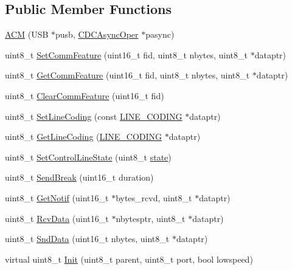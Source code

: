 \subsection*{\-Public \-Member \-Functions}
\begin{DoxyCompactItemize}
\item 
\hyperlink{class_a_c_m_aa5d83ef9d48dab404090e9136522707a}{\-A\-C\-M} (\-U\-S\-B $\ast$pusb, \hyperlink{class_c_d_c_async_oper}{\-C\-D\-C\-Async\-Oper} $\ast$pasync)
\item 
uint8\-\_\-t \hyperlink{class_a_c_m_a62c91ac62e8e3bf66bc3940d5b934c10}{\-Set\-Comm\-Feature} (uint16\-\_\-t fid, uint8\-\_\-t nbytes, uint8\-\_\-t $\ast$dataptr)
\item 
uint8\-\_\-t \hyperlink{class_a_c_m_a18208672a707391863b8abdc6714c825}{\-Get\-Comm\-Feature} (uint16\-\_\-t fid, uint8\-\_\-t nbytes, uint8\-\_\-t $\ast$dataptr)
\item 
uint8\-\_\-t \hyperlink{class_a_c_m_a74a3484a0f524ddf0e228c17addcebdf}{\-Clear\-Comm\-Feature} (uint16\-\_\-t fid)
\item 
uint8\-\_\-t \hyperlink{class_a_c_m_a79eb8706c7f1432593fb2f2eee0da504}{\-Set\-Line\-Coding} (const \hyperlink{struct_l_i_n_e___c_o_d_i_n_g}{\-L\-I\-N\-E\-\_\-\-C\-O\-D\-I\-N\-G} $\ast$dataptr)
\item 
uint8\-\_\-t \hyperlink{class_a_c_m_a9d922317b25a7ae086a6fe79984ab8d1}{\-Get\-Line\-Coding} (\hyperlink{struct_l_i_n_e___c_o_d_i_n_g}{\-L\-I\-N\-E\-\_\-\-C\-O\-D\-I\-N\-G} $\ast$dataptr)
\item 
uint8\-\_\-t \hyperlink{class_a_c_m_af2e08e5f03f17ed039985147a7129bbd}{\-Set\-Control\-Line\-State} (uint8\-\_\-t \hyperlink{_mouse___chronos_8cpp_a2db8c09b4598a5b457667c34a46f311e}{state})
\item 
uint8\-\_\-t \hyperlink{class_a_c_m_a2a618cbff52737740e76977db557ddff}{\-Send\-Break} (uint16\-\_\-t duration)
\item 
uint8\-\_\-t \hyperlink{class_a_c_m_a4deddfbfb1d9010b71096cbfd46b2dfb}{\-Get\-Notif} (uint16\-\_\-t $\ast$bytes\-\_\-rcvd, uint8\-\_\-t $\ast$dataptr)
\item 
uint8\-\_\-t \hyperlink{class_a_c_m_a7f455b7a649522c29f2e63d668b0ccca}{\-Rcv\-Data} (uint16\-\_\-t $\ast$nbytesptr, uint8\-\_\-t $\ast$dataptr)
\item 
uint8\-\_\-t \hyperlink{class_a_c_m_ac96caeb8d657fa76219872ceb4379923}{\-Snd\-Data} (uint16\-\_\-t nbytes, uint8\-\_\-t $\ast$dataptr)
\item 
virtual uint8\-\_\-t \hyperlink{class_a_c_m_ad3210651d58c77d3ded4b4b83a9476b7}{\-Init} (uint8\-\_\-t parent, uint8\-\_\-t port, bool lowspeed)

\end{DoxyCompactItemize}
